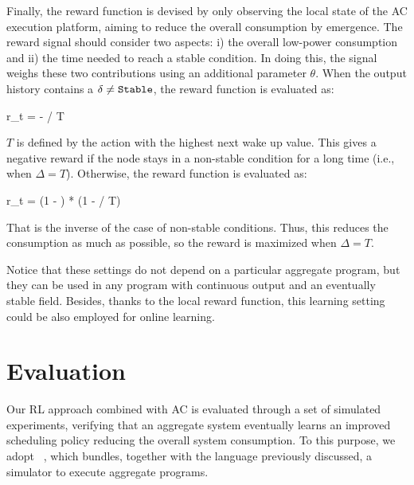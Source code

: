 Finally, the reward function is devised by only observing the local state of the \ac{AC} execution platform, aiming to reduce the overall consumption by emergence.
%
The reward signal should consider two aspects: i) the overall low-power consumption and ii) the time needed to reach a stable condition.  
In doing this, the signal weighs these two contributions using an additional parameter $\theta$.
 When the output history contains a $\delta \neq \text{\texttt{Stable}}$, the reward function is evaluated as:
\begin{iequation}
r_t = - \theta * \Delta / T
\end{iequation}
$T$ is defined by the action with the highest next wake up value.
%
This gives a negative reward if the node stays in a non-stable condition for a long time (i.e., when $\Delta = T$).
Otherwise, the reward function is evaluated as:
\begin{iequation}
r_t = (1 - \theta) * (1 - \Delta / T)
\end{iequation}
That is the inverse of the case of non-stable conditions. 
 Thus, this reduces the consumption as much as possible, so the reward is maximized when $\Delta = T$. 

Notice that these settings do not depend on a particular aggregate program, 
 but they can be used in any program with continuous output and an eventually stable field. 
%
Besides, thanks to the local reward function, this learning setting could be also employed for online learning.

\newcommand{\rlsol}{{\sc{}Rl}}
\newcommand{\periodicsol}{{\sc{}Periodic}}
\newcommand{\adhocsol}{{\sc{}Ad-hoc}}
\newcommand{\swapscen}{{\sc{}Swap}}
\newcommand{\multiswap}{{\sc{}MultiSwap}}
\section{Evaluation}\label{sec:evaluation}


Our \ac{RL} approach combined with \ac{AC} is evaluated through a set of simulated experiments, 
 verifying that an aggregate system eventually learns an improved scheduling policy reducing the overall system consumption.
%
To this purpose, we adopt \scafi{}~\cite{DBLP:conf/isola/CasadeiVAD20}, 
 which bundles, together with the language previously discussed, a simulator to execute aggregate programs.
 
